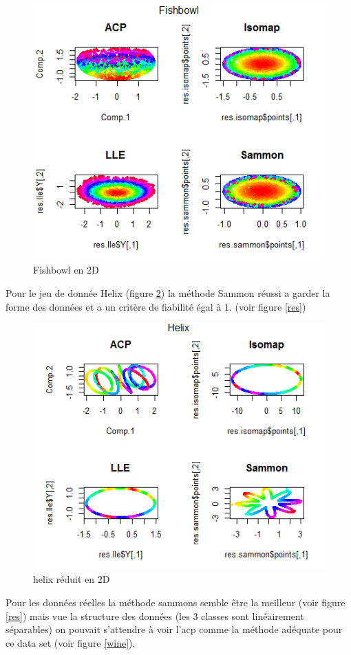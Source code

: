 \documentclass[twoside,twocolumn]{article}
\begin{document}
\begin{figure}[ht!]
 \centering
\includegraphics[width=\linewidth]{f.png}
\vspace{-20pt}
 \caption{Fishbowl en 2D}
 \label{fish}
\end{figure} 

Pour le jeu de donnée Helix (figure \ref{helix}) la méthode Sammon réussi a garder la forme des données et a un critère de fiabilité égal à $1$. (voir figure \ref{res})

\begin{figure}[ht!]
 \centering
\includegraphics[width=\linewidth]{hh1.png}
\vspace{-20pt}
 \caption{helix réduit en 2D}
 \label{helix}
\end{figure} 
Pour les données réelles la méthode sammons semble être la meilleur (voir figure \ref{res}) mais vue la structure des données (les 3 classes sont linéairement séparables) on pouvait s’attendre à voir l’acp comme la méthode adéquate pour ce data set (voir figure \ref{wine}).
\end{document}
